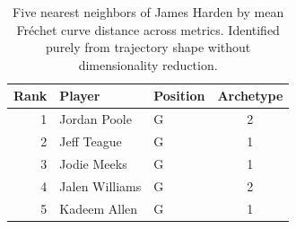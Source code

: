 \begin{table}[htbp]
  \centering\small
  \begin{tabular}{rllc}
    \toprule
    Rank & Player & Position & Archetype \\
    \midrule
    1 & Jordan Poole & G & 2 \\
    2 & Jeff Teague & G & 1 \\
    3 & Jodie Meeks & G & 1 \\
    4 & Jalen Williams & G & 2 \\
    5 & Kadeem Allen & G & 1 \\
    \bottomrule
  \end{tabular}
  \caption{Five nearest neighbors of James Harden by mean Fr\'{e}chet curve distance across metrics. Identified purely from trajectory shape without dimensionality reduction.}
  \label{tab:James_Harden_frechet_curve_neighbors}
\end{table}

